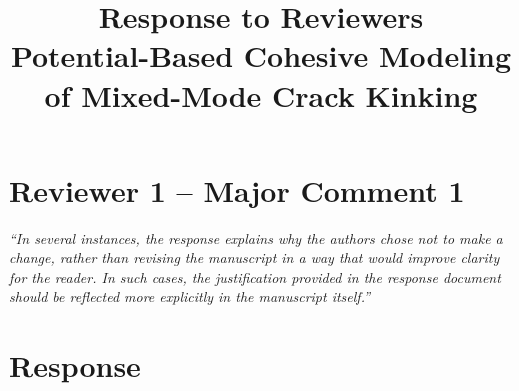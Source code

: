 \documentclass[12pt,a4paper]{article}
\title{Response to Reviewers\\
	\large Potential-Based Cohesive Modeling of Mixed-Mode Crack Kinking}
\author{}
\date{}
\begin{document}
	\maketitle

	\section*{Reviewer 1 -- Major Comment 1}
	
	\begin{tcolorbox}[reviewerbox]
		\emph{``In several instances, the response explains why the authors chose not to make a change, rather than revising the manuscript in a way that would improve clarity for the reader. In such cases, the justification provided in the response document should be reflected more explicitly in the manuscript itself.''}
	\end{tcolorbox}
	
	\section*{Response}
	
\end{document}
